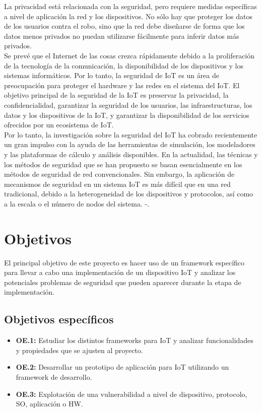 La privacidad está relacionada con la seguridad, pero requiere medidas específicas a nivel de aplicación la red y los dispositivos. No sólo hay que proteger los datos de los usuarios contra el robo, sino que la red debe diseñarse de forma que los datos menos privados no puedan utilizarse fácilmente para inferir datos más privados. \cite{serpanos2018internet} \\ 

Se prevé que el Internet de las cosas crezca rápidamente debido a la proliferación de la tecnología de la comunicación, la disponibilidad de los dispositivos y los sistemas informáticos. Por lo tanto, la seguridad de IoT es un área de preocupación para proteger el hardware y las redes en el sistema del IoT. El objetivo principal de la seguridad de la IoT es preservar la privacidad, la confidencialidad, garantizar la seguridad de los usuarios, las infraestructuras, los datos y los dispositivos de la IoT, y garantizar la disponibilidad de los servicios ofrecidos por un ecosistema de IoT. \\

Por lo tanto, la investigación sobre la seguridad del IoT ha cobrado recientemente un gran impulso con la ayuda de las herramientas de simulación, los modeladores y las plataformas de cálculo y análisis disponibles. En la actualidad, las técnicas y los métodos de seguridad que se han propuesto se basan esencialmente en los métodos de seguridad de red convencionales. Sin embargo, la aplicación de mecanismos de seguridad en un sistema IoT es más difícil que en una red tradicional, debido a la heterogeneidad de los dispositivos y protocolos, así como a la escala o el número de nodos del sistema. \cite{lin2017survey}-\cite{hassan2019current}.

\section{Objetivos} \label{sec:objetivos}

El principal objetivo de este proyecto es hacer uso de un framework específico para llevar a cabo una implementación de un dispositivo IoT y analizar los potenciales problemas de seguridad que pueden aparecer durante la etapa de implementación.

\subsection{Objetivos específicos}

\begin{itemize}
    \item \textbf{OE.1:} Estudiar los distintos frameworks para IoT y analizar funcionalidades y propiedades que se ajusten al proyecto.
    \item \textbf{OE.2:} Desarrollar un prototipo de aplicación para IoT utilizando un framework de desarrollo.
    \item \textbf{OE.3:} Explotación de una vulnerabilidad a nivel de dispositivo, protocolo, SO, aplicación o HW.
\end{itemize}